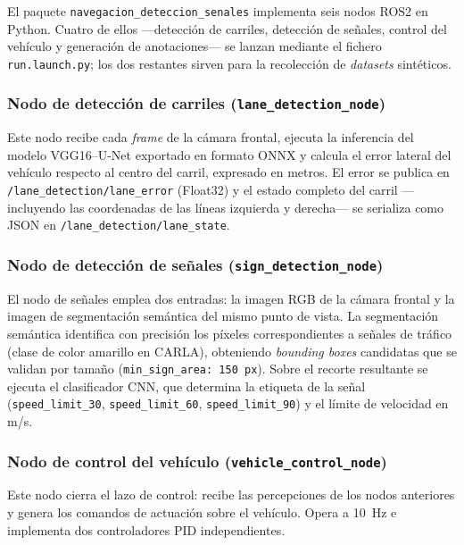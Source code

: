 \documentclass[12pt, a4paper]{article}
\begin{document}
El paquete \texttt{navegacion\_deteccion\_senales} implementa seis nodos ROS2 en Python. Cuatro de ellos ---detección de carriles, detección de señales, control del vehículo y generación de anotaciones--- se lanzan mediante el fichero \texttt{run.launch.py}; los dos restantes sirven para la recolección de \textit{datasets} sintéticos.

\subsubsection{Nodo de detección de carriles (\texttt{lane\_detection\_node})}

Este nodo recibe cada \textit{frame} de la cámara frontal, ejecuta la inferencia del modelo VGG16--U-Net exportado en formato ONNX y calcula el error lateral del vehículo respecto al centro del carril, expresado en metros. El error se publica en \\ \texttt{/lane\_detection/lane\_error} (Float32) y el estado completo del carril —incluyendo las coordenadas de las líneas izquierda y derecha— se serializa como JSON en \texttt{/lane\_detection/lane\_state}.

\subsubsection{Nodo de detección de señales (\texttt{sign\_detection\_node})}

El nodo de señales emplea dos entradas: la imagen RGB de la cámara frontal y la imagen de segmentación semántica del mismo punto de vista. La segmentación semántica identifica con precisión los píxeles correspondientes a señales de tráfico (clase de color amarillo en CARLA), obteniendo \textit{bounding boxes} candidatas que se validan por tamaño (\texttt{min\_sign\_area: 150~px}). Sobre el recorte resultante se ejecuta el clasificador CNN, que determina la etiqueta de la señal (\texttt{speed\_limit\_30}, \texttt{speed\_limit\_60}, \texttt{speed\_limit\_90}) y el límite de velocidad en m/s.

\subsubsection{Nodo de control del vehículo (\texttt{vehicle\_control\_node})}

Este nodo cierra el lazo de control: recibe las percepciones de los nodos anteriores y genera los comandos de actuación sobre el vehículo. Opera a 10~Hz e implementa dos controladores PID independientes.
\end{document}

